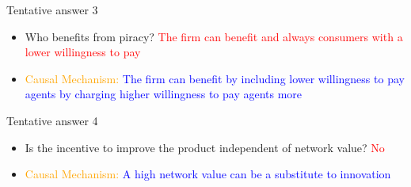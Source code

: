 \documentclass{beamer}
\numberwithin{equation}{section}
\begin{document}
\begin{frame}{Tentative answer 3}
\begin{itemize}
    \item Who benefits from piracy?  \textcolor{red}{The firm can benefit and always consumers with a lower willingness to pay}
    \item \textcolor{orange}{Causal Mechanism:} \textcolor{blue}{The firm can benefit by including lower willingness to pay agents by charging higher willingness to pay agents more}
\end{itemize}
\end{frame}
\begin{frame}{Tentative answer 4}
\begin{itemize}
    \item Is the incentive to improve the product independent of network value? \textcolor{red}{No}
    \item \textcolor{orange}{Causal Mechanism:} \textcolor{blue}{A high network value can be a substitute to innovation}
\end{itemize}
\end{frame}
\end{document}
